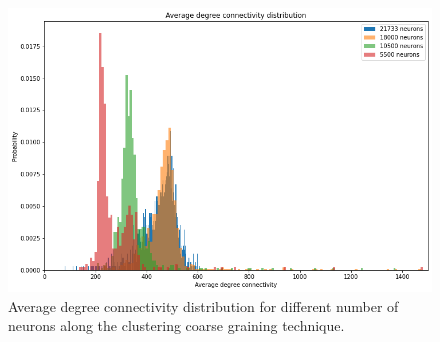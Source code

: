 \begin{figure}
    \centering
    \includegraphics[width=\textwidth]{Images/Coarse/Avg_deg_con_distr.png}
    \caption{Average degree connectivity distribution for different number of neurons along
    the clustering coarse graining technique.}
    \label{fig:con_distr}
\end{figure}


